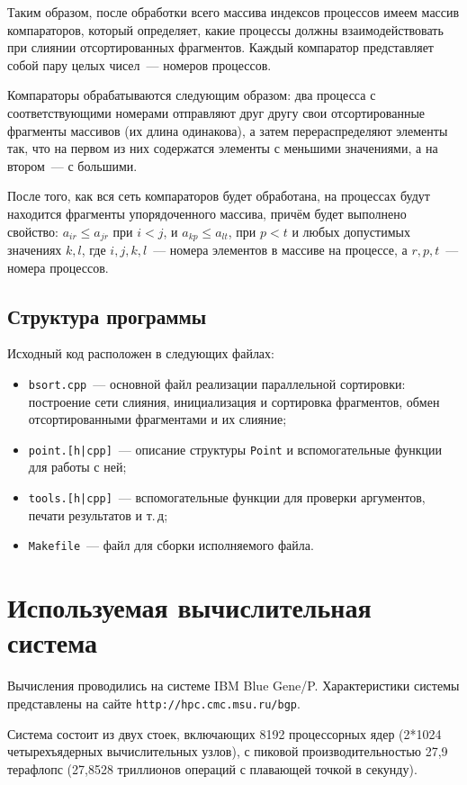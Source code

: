 \documentclass[oneside,final,14pt]{extreport}
\begin{document}
Таким образом, после обработки всего массива индексов процессов имеем
массив компараторов, который определяет, какие процессы должны взаимодействовать
при слиянии отсортированных фрагментов. Каждый компаратор представляет собой
пару целых чисел~--- номеров процессов.

Компараторы обрабатываются следующим образом: два процесса с соответствующими
номерами отправляют друг другу свои отсортированные фрагменты массивов (их
длина одинакова), а затем перераспределяют элементы так, что на первом из
них содержатся элементы с меньшими значениями, а на втором~--- с большими.

После того, как вся сеть компараторов будет обработана, на процессах
будут находится фрагменты упорядоченного массива, причём будет выполнено
свойство: $a_{ir} \leq a_{jr}$ при $i < j$, и $a_{kp} \leq a_{lt}$, при
$p < t$ и любых допустимых значениях $k, l$, где $i, j, k, l$~--- номера
элементов в массиве на процессе, а $r, p, t$~--- номера процессов.

\section*{Структура программы}

Исходный код расположен в следующих файлах:
\begin{itemize}
    \item \texttt{bsort.cpp}~--- основной файл реализации параллельной сортировки:
        построение сети слияния, инициализация и сортировка фрагментов, обмен
        отсортированными фрагментами и их слияние;
    \item \texttt{point.[h|cpp]}~--- описание структуры \texttt{Point} и
        вспомогательные функции для работы с ней;
    \item \texttt{tools.[h|cpp]}~--- вспомогательные функции для проверки аргументов,
        печати результатов и т.\,д;
    \item \texttt{Makefile}~--- файл для сборки исполняемого файла.
\end{itemize}

\chapter*{Используемая вычислительная система}

Вычисления проводились на системе IBM Blue Gene/P.
Характеристики системы представлены на сайте \verb|http://hpc.cmc.msu.ru/bgp|.

Система состоит из двух стоек, включающих 8192 процессорных ядер
(2*1024 четырехъядерных вычислительных узлов), с пиковой производительностью
27,9 терафлопс (27,8528 триллионов операций с плавающей точкой в секунду).
\end{document}
